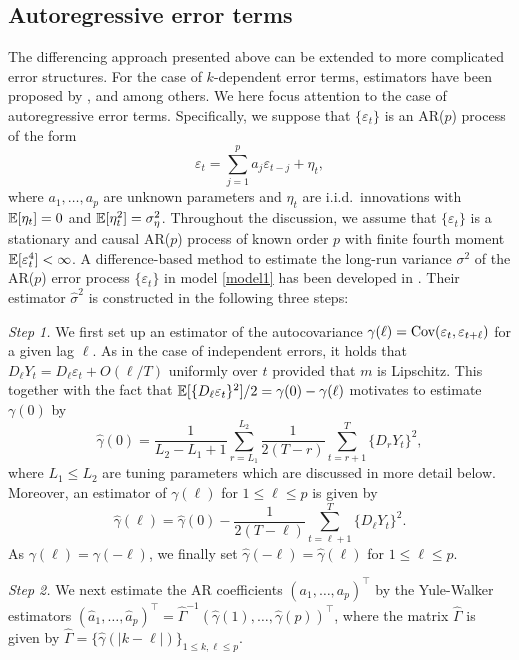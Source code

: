 \subsection{Autoregressive error terms}\label{subsec-error-var-ar}


The differencing approach presented above can be extended to more complicated error structures. For the case of $k$-dependent error terms, estimators have been proposed by \cite{MuellerStadtmueller1988}, \cite{Herrmann1992} and \cite{Munk2017} among others. We here focus attention to the case of autoregressive error terms. Specifically, we suppose that $\{\varepsilon_t\}$ is an AR($p$) process of the form
\[ \varepsilon_t = \sum\limits_{j=1}^p a_j \varepsilon_{t-j} + \eta_t, \]
where $a_1,\ldots,a_p$ are unknown parameters and $\eta_t$ are i.i.d.\ innovations with $\mathbb{E}[\eta_t] = 0$ and $\mathbb{E}[\eta_t^2] = \sigma_\eta^2$. Throughout the discussion, we assume that $\{\varepsilon_t\}$ is a stationary and causal AR($p$) process of known order $p$ with finite fourth moment $\mathbb{E}[\varepsilon_t^4] < \infty$. A difference-based method to estimate the long-run variance $\sigma^2$ of the AR($p$) error process $\{\varepsilon_t\}$ in model \eqref{model1} has been developed in \cite{Hall2003}. Their estimator $\widehat{\sigma}^2$ is constructed in the following three steps: 
\vspace{10pt}


\textit{Step 1.} We first set up an estimator of the autocovariance $\gamma(\ell) = \textnormal{Cov}(\varepsilon_t,\varepsilon_{t+\ell})$ for a given lag $\ell$. As in the case of independent errors, it holds that $D_\ell Y_t = D_\ell \varepsilon_t + O(\ell/T)$ uniformly over $t$ provided that $m$ is Lipschitz. This together with the fact that $\mathbb{E}[ \{  D_\ell \varepsilon_t \}^2 ] / 2 = \gamma(0) - \gamma(\ell)$ motivates to estimate $\gamma(0)$ by 
\[ \widehat{\gamma}(0) = \frac{1}{L_2-L_1+1}\sum_{r=L_1}^{L_2}\frac{1}{2(T-r)}\sum_{t=r+1}^T\{D_rY_t\}^2, \]
where $L_1\le L_2$ are tuning parameters which are discussed in more detail below. Moreover, an estimator of $\gamma(\ell)$ for $1 \le \ell \le p$ is given by 
\[ \widehat{\gamma}(\ell) = \widehat{\gamma}(0) - \frac{1}{2(T-\ell)}\sum_{t=\ell+1}^T \{D_\ell Y_t\}^2. \]
As $\gamma(\ell) = \gamma(-\ell)$, we finally set $\widehat{\gamma}(-\ell) = \widehat{\gamma}(\ell)$ for $1 \le \ell \le p$. 
\vspace{10pt}

\textit{Step 2.} We next estimate the AR coefficients $(a_1,\ldots,a_p)^\top$ by the Yule-Walker estimators $(\widehat{a}_1,\ldots,\widehat{a}_p)^\top = \widehat{\Gamma}^{-1} (\widehat{\gamma}(1), \ldots, \widehat{\gamma}(p))^\top$, where the matrix $\widehat{\Gamma}$ is given by $\widehat{\Gamma} = \{ \widehat{\gamma}(|k-\ell|) \}_{1 \le k,\ell \le p}$. 
\vspace{10pt}

